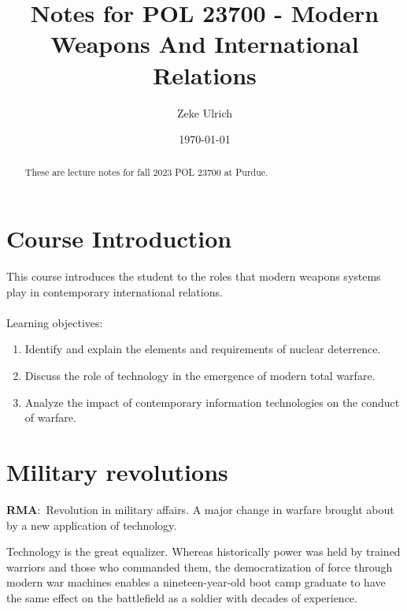 \documentclass[nobib]{tufte-handout}
\title{Notes for POL 23700 - Modern Weapons And International Relations}
\author[Zeke Ulrich]{Zeke Ulrich}
\date{\today}  %
\newcommand{\defn}[2]{\noindent\textbf{#1}:\ #2}
\begin{document}
\maketitle

\begin{abstract}
These are lecture notes for fall 2023 POL 23700 at Purdue.
\end{abstract}

\tableofcontents

\section{Course Introduction}
This course introduces the student to the roles that modern weapons systems 
play in contemporary international relations.
\\~\\
Learning objectives: 
\begin{enumerate}
    \item Identify and explain the elements and requirements of nuclear deterrence.
    \item Discuss the role of technology in the emergence of modern total warfare.
    \item Analyze the impact of contemporary information technologies on the conduct of warfare.
\end{enumerate}

\pagebreak 

\section{Military revolutions}
\defn{RMA}{Revolution in military affairs. A major change in warfare brought about by a new application of technology.}

Technology is the great equalizer. Whereas historically
power was held by trained warriors and those who 
commanded them, the democratization of force through 
modern war machines enables a nineteen-year-old boot camp 
graduate to have the same effect on the battlefield
as a soldier with decades of experience. 
\end{document}
